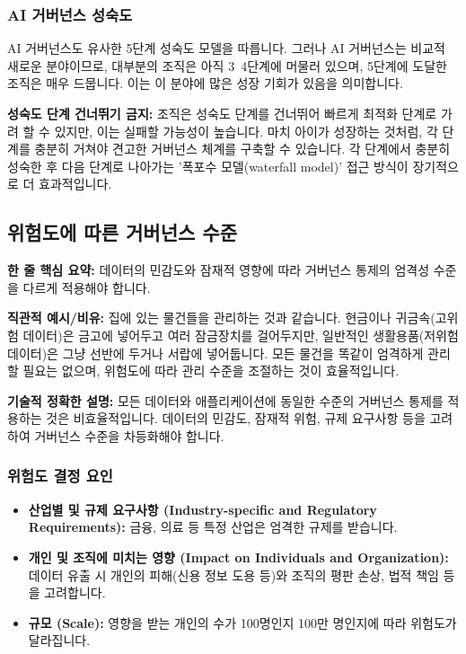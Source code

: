 \documentclass[11pt,a4paper]{article}
\theoremstyle{definition}
\begin{document}
\subsubsection*{AI 거버넌스 성숙도}
AI 거버넌스도 유사한 5단계 성숙도 모델을 따릅니다. 그러나 AI 거버넌스는 비교적 새로운 분야이므로, 대부분의 조직은 아직 3~4단계에 머물러 있으며, 5단계에 도달한 조직은 매우 드뭅니다. 이는 이 분야에 많은 성장 기회가 있음을 의미합니다.

\begin{cautionbox}
\textbf{성숙도 단계 건너뛰기 금지:}
조직은 성숙도 단계를 건너뛰어 빠르게 최적화 단계로 가려 할 수 있지만, 이는 실패할 가능성이 높습니다. 마치 아이가 성장하는 것처럼, 각 단계를 충분히 거쳐야 견고한 거버넌스 체계를 구축할 수 있습니다. 각 단계에서 충분히 성숙한 후 다음 단계로 나아가는 '폭포수 모델(waterfall model)' 접근 방식이 장기적으로 더 효과적입니다.
\end{cautionbox}

\newpage
\subsection*{위험도에 따른 거버넌스 수준}

\begin{keyconceptbox}
\textbf{한 줄 핵심 요약:} 데이터의 민감도와 잠재적 영향에 따라 거버넌스 통제의 엄격성 수준을 다르게 적용해야 합니다.
\end{keyconceptbox}

\textbf{직관적 예시/비유:}
집에 있는 물건들을 관리하는 것과 같습니다. 현금이나 귀금속(고위험 데이터)은 금고에 넣어두고 여러 잠금장치를 걸어두지만, 일반적인 생활용품(저위험 데이터)은 그냥 선반에 두거나 서랍에 넣어둡니다. 모든 물건을 똑같이 엄격하게 관리할 필요는 없으며, 위험도에 따라 관리 수준을 조절하는 것이 효율적입니다.

\textbf{기술적 정확한 설명:}
모든 데이터와 애플리케이션에 동일한 수준의 거버넌스 통제를 적용하는 것은 비효율적입니다. 데이터의 민감도, 잠재적 위험, 규제 요구사항 등을 고려하여 거버넌스 수준을 차등화해야 합니다.

\subsubsection*{위험도 결정 요인}
\begin{itemize}
    \item \textbf{산업별 및 규제 요구사항 (Industry-specific and Regulatory Requirements):} 금융, 의료 등 특정 산업은 엄격한 규제를 받습니다.
    \item \textbf{개인 및 조직에 미치는 영향 (Impact on Individuals and Organization):} 데이터 유출 시 개인의 피해(신용 정보 도용 등)와 조직의 평판 손상, 법적 책임 등을 고려합니다.
    \item \textbf{규모 (Scale):} 영향을 받는 개인의 수가 100명인지 100만 명인지에 따라 위험도가 달라집니다.
\end{itemize}
\end{document}
